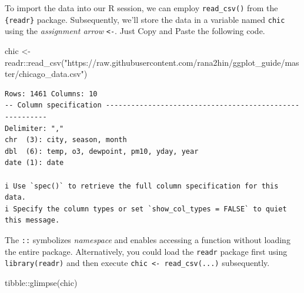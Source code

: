 \documentclass[
  letterpaper,
]{scrbook}
\newenvironment{Shaded}{\begin{snugshade}}{\end{snugshade}}
\newcommand{\FunctionTok}[1]{\textcolor[rgb]{0.28,0.35,0.67}{#1}}
\newcommand{\NormalTok}[1]{\textcolor[rgb]{0.00,0.23,0.31}{#1}}
\newcommand{\OtherTok}[1]{\textcolor[rgb]{0.00,0.23,0.31}{#1}}
\newcommand{\SpecialCharTok}[1]{\textcolor[rgb]{0.37,0.37,0.37}{#1}}
\newcommand{\StringTok}[1]{\textcolor[rgb]{0.13,0.47,0.30}{#1}}
\begin{document}
To import the data into our R session, we can employ
\texttt{read\_csv()} from the \texttt{\{readr\}} package. Subsequently,
we'll store the data in a variable named \texttt{chic} using the
\emph{assignment arrow} \texttt{\textless{}-}. Just Copy and Paste the
following code.

\begin{Shaded}
\begin{Highlighting}[]
\NormalTok{chic }\OtherTok{\textless{}{-}}\NormalTok{ readr}\SpecialCharTok{::}\FunctionTok{read\_csv}\NormalTok{(}\StringTok{"https://raw.githubusercontent.com/rana2hin/ggplot\_guide/master/chicago\_data.csv"}\NormalTok{)}
\end{Highlighting}
\end{Shaded}

\begin{verbatim}
Rows: 1461 Columns: 10
-- Column specification --------------------------------------------------------
Delimiter: ","
chr  (3): city, season, month
dbl  (6): temp, o3, dewpoint, pm10, yday, year
date (1): date

i Use `spec()` to retrieve the full column specification for this data.
i Specify the column types or set `show_col_types = FALSE` to quiet this message.
\end{verbatim}

\begin{tcolorbox}[enhanced jigsaw, rightrule=.15mm, arc=.35mm, title=\textcolor{quarto-callout-tip-color}{\faLightbulb}\hspace{0.5em}{Using namespace Directly}, colback=white, toptitle=1mm, colbacktitle=quarto-callout-tip-color!10!white, breakable, left=2mm, opacityback=0, leftrule=.75mm, bottomrule=.15mm, bottomtitle=1mm, colframe=quarto-callout-tip-color-frame, coltitle=black, toprule=.15mm, opacitybacktitle=0.6, titlerule=0mm]

The \texttt{::} symbolizes \emph{namespace} and enables accessing a
function without loading the entire package. Alternatively, you could
load the \texttt{readr} package first using \texttt{library(readr)} and
then execute \texttt{chic\ \textless{}-\ read\_csv(...)} subsequently.

\end{tcolorbox}

\begin{Shaded}
\begin{Highlighting}[]
\NormalTok{tibble}\SpecialCharTok{::}\FunctionTok{glimpse}\NormalTok{(chic)}
\end{Highlighting}
\end{Shaded}
\end{document}

